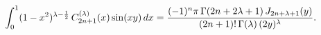 \[\int_{0}^{1}(1-x^{2})^{\lambda-\frac{1}{2}}\mathop{C^{(\lambda)}_{2n+1}\/}%
\nolimits\!\left(x\right)\mathop{\sin\/}\nolimits\!\left(xy\right)dx=\frac{(-1%
)^{n}\pi\mathop{\Gamma\/}\nolimits\!\left(2n+2\lambda+1\right)\mathop{J_{2n+%
\lambda+1}\/}\nolimits\!\left(y\right)}{(2n+1)!\mathop{\Gamma\/}\nolimits\!%
\left(\lambda\right)(2y)^{\lambda}}.\]